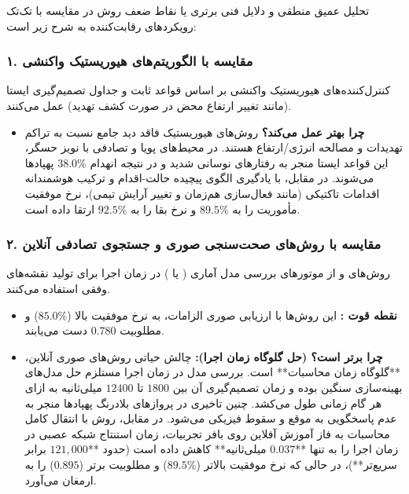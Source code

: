 \documentclass[oneside,openany,a4paper,12pt,draft]{article}
\begin{document}
تحلیل عمیق منطقی و دلایل فنی برتری یا نقاط ضعف روش  در مقایسه با تک‌تک رویکردهای رقابت‌کننده به شرح زیر است:

\subsubsection{۱. مقایسه با الگوریتم‌های هیوریستیک واکنشی }
کنترل‌کننده‌های هیوریستیک واکنشی بر اساس قواعد ثابت و جداول تصمیم‌گیری ایستا (مانند تغییر ارتفاع محض در صورت کشف تهدید) عمل می‌کنند. 
\begin{itemize}
    \item \textbf{چرا  بهتر عمل می‌کند؟} روش‌های هیوریستیک فاقد دید جامع نسبت به تراکم تهدیدات و مصالحه انرژی/ارتفاع هستند. در محیط‌های پویا و تصادفی با نویز حسگر، این قواعد ایستا منجر به رفتارهای نوسانی شدید و در نتیجه انهدام $38.0\%$ پهپادها می‌شوند. در مقابل،  با یادگیری الگوی پیچیده حالت-اقدام و ترکیب هوشمندانه اقدامات تاکتیکی (مانند فعال‌سازی هم‌زمان  و تغییر آرایش تیمی)، نرخ موفقیت مأموریت را به $\mathbf{89.5\%}$ و نرخ بقا را به $\mathbf{92.5\%}$ ارتقا داده است.
\end{itemize}

\subsubsection{۲. مقایسه با روش‌های صحت‌سنجی صوری و جستجوی تصادفی آنلاین }
روش‌های  و  از موتورهای بررسی مدل آماری ( یا ) در زمان اجرا برای تولید نقشه‌های وفقی استفاده می‌کنند.
\begin{itemize}
    \item \textbf{نقطه قوت :} این روش‌ها با ارزیابی صوری الزامات، به نرخ موفقیت بالا ($85.0\%$) و مطلوبیت $0.780$ دست می‌یابند.
    \item \textbf{چرا  برتر است؟ (حل گلوگاه زمان اجرا):} چالش حیاتی روش‌های صوری آنلاین، **گلوگاه زمان محاسبات** است. بررسی مدل در زمان اجرا مستلزم حل مدل‌های بهینه‌سازی سنگین بوده و زمان تصمیم‌گیری آن بین $1800$ تا $12400$ میلی‌ثانیه به ازای هر گام زمانی طول می‌کشد. چنین تاخیری در پروازهای بلادرنگ پهپادها منجر به عدم پاسخگویی به موقع و سقوط فیزیکی می‌شود. در مقابل، روش  با انتقال کامل محاسبات به فاز آموزش آفلاین روی بافر تجربیات، زمان استنتاج شبکه عصبی در زمان اجرا را به تنها **$0.037$ میلی‌ثانیه** کاهش داده است (حدود **$121{,}000$ برابر سریع‌تر**)، در حالی که نرخ موفقیت بالاتر ($\mathbf{89.5\%}$) و مطلوبیت برتر ($\mathbf{0.895}$) را به ارمغان می‌آورد.
\end{itemize}
\end{document}
